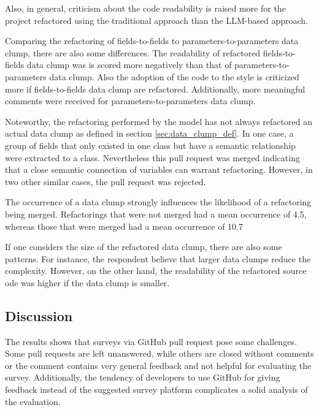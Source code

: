 Also, in general, criticism about the code readability is raised more for the project refactored using the traditional approach than the \ac{LLM}-based approach.

Comparing the refactoring of fields-to-fields to parameters-to-parameters data clump, there are also some differences. The readability of refactored fields-to-fields data clump was is scored more negatively than that of parameters-to-parameters data clump. Also the adoption of the code to the style is criticized more if fields-to-fields data clump are refactored. Additionally, more meaningful comments were received for parameters-to-parameters data clump.

Noteworthy, the refactoring performed by the model has not always refactored an actual data clump as defined in section \ref{sec:data_clump_def}. In one case, a group of fields that only existed in one class but have a semantic relationship were extracted to a class. Nevertheless this pull request was merged indicating that a close semantic connection of variables can warrant refactoring. However, in two other similar cases, the pull request was rejected. 

The occurrence of a data clump strongly influences the likelihood of a refactoring being merged. Refactorings that were not merged had a mean occurrence of 4.5, whereas those that were merged had a mean occurrence of 10.7

If one considers the size of the refactored data clump, there are also some patterns. For instance, the respondent believe that larger data clumps reduce the complexity. However, on the other hand, the readability of the refactored source ode was higher if the data clump is smaller.



\subsection{Discussion}
The results shows that surveys via GitHub pull request pose some challenges. Some pull requests are left unanswered, while others are closed without comments or the comment contains very general feedback and not helpful for evaluating the survey. Additionally, the tendency of developers to use GitHub for giving feedback  instead of the suggested survey platform complicates a solid analysis of the evaluation.

